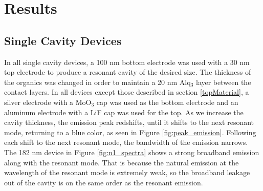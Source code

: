 \documentclass{report}
\begin{document}
\chapter{Results}

    \section{Single Cavity Devices} \label{n=1}

        In all single cavity devices, a 100 nm bottom electrode was used with a 30 nm top electrode to produce a resonant cavity of the desired size. The thickness of the organics was changed in order to maintain a 20 nm Alq$_3$ layer between the contact layers. In all devices except those described in section \ref{topMaterial}, a silver electrode with a MoO$_3$ cap was used as the bottom electrode and an aluminum electrode with a LiF cap was used for the top. As we increase the cavity thickness, the emission peak redshifts, until it shifts to the next resonant mode, returning to a blue color, as seen in Figure \ref{fig:peak_emission}. Following each shift to the next resonant mode, the bandwidth of the emission narrows. The 182 nm device in Figure \ref{fig:n1_spectra} shows a strong broadband emission along with the resonant mode. That is because the natural emission at the wavelength of the resonant mode is extremely weak, so the broadband leakage out of the cavity is on the same order as the resonant emission.
        

        \newpage
\end{document}
